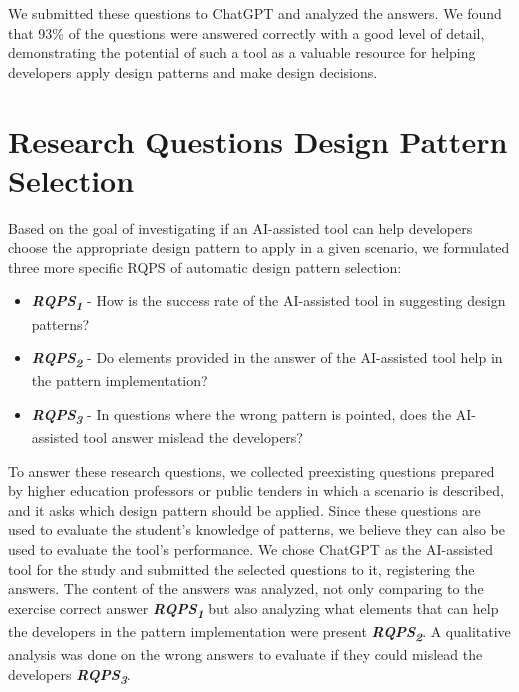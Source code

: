 We submitted these questions to ChatGPT and analyzed the answers. We found that 93\% of the questions were answered correctly with a good level of detail, demonstrating the potential of such a tool as a valuable resource for helping developers apply design patterns and make design decisions.


\section{Research Questions Design Pattern Selection}\label{ResearchPreliminaryStudy}

Based on the goal of investigating if an AI-assisted tool can help developers choose the appropriate design pattern to apply in a given scenario, we formulated three more specific \ac{RQPS} of automatic design pattern selection:

\begin{itemize}
    \item \textbf{\textit{RQPS\textsubscript{1}}} - How is the success rate of the AI-assisted tool in suggesting design patterns?
    \item \textbf{\textit{RQPS\textsubscript{2}}} - Do elements provided in the answer of the AI-assisted tool help in the pattern implementation?
    \item \textbf{\textit{RQPS\textsubscript{3}}} - In questions where the wrong pattern is pointed, does the AI-assisted tool answer mislead the developers?
\end{itemize}

To answer these research questions, we collected preexisting questions prepared by higher education professors or public tenders in which a scenario is described, and it asks which design pattern should be applied. Since these questions are used to evaluate the student's knowledge of patterns, we believe they can also be used to evaluate the tool's performance. We chose ChatGPT as the AI-assisted tool for the study and submitted the selected questions to it, registering the answers. The content of the answers was analyzed, not only comparing to the exercise correct answer \textbf{\textit{RQPS\textsubscript{1}}} but also analyzing what elements that can help the developers in the pattern implementation were present \textbf{\textit{RQPS\textsubscript{2}}}. A qualitative analysis was done on the wrong answers to evaluate if they could mislead the developers \textbf{\textit{RQPS\textsubscript{3}}}.

